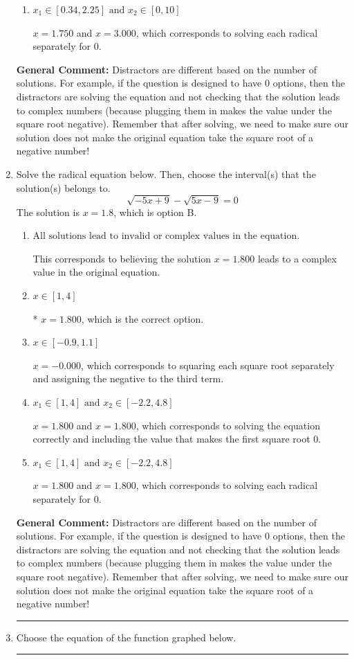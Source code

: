 \documentclass{extbook}[14pt]
\newcommand{\litem}[1]{\item #1

\rule{\textwidth}{0.4pt}}
\begin{document}
\begin{enumerate}
{\begin{enumerate}[label=\Alph*.]
* $x = 2.286$, which is the correct option.
\item \( x_1 \in [0.34, 2.25] \text{ and } x_2 \in [0,10] \)

$x = 1.750$ and $x = 3.000$, which corresponds to solving each radical separately for 0.
\end{enumerate}

\textbf{General Comment:} Distractors are different based on the number of solutions. For example, if the question is designed to have 0 options, then the distractors are solving the equation and not checking that the solution leads to complex numbers (because plugging them in makes the value under the square root negative). Remember that after solving, we need to make sure our solution does not make the original equation take the square root of a negative number!
}
\litem{
Solve the radical equation below. Then, choose the interval(s) that the solution(s) belongs to.
\[ \sqrt{-5 x + 9} - \sqrt{5 x - 9} = 0 \]The solution is \( x = 1.8 \), which is option B.\begin{enumerate}[label=\Alph*.]
\item \( \text{All solutions lead to invalid or complex values in the equation.} \)

This corresponds to believing the solution $x = 1.800$ leads to a complex value in the original equation.
\item \( x \in [1,4] \)

* $x = 1.800$, which is the correct option.
\item \( x \in [-0.9,1.1] \)

$x = -0.000$, which corresponds to squaring each square root separately and assigning the negative to the third term.
\item \( x_1 \in [1, 4] \text{ and } x_2 \in [-2.2,4.8] \)

$x = 1.800$ and $x = 1.800$, which corresponds to solving the equation correctly and including the value that makes the first square root 0.
\item \( x_1 \in [1, 4] \text{ and } x_2 \in [-2.2,4.8] \)

$x = 1.800$ and $x = 1.800$, which corresponds to solving each radical separately for 0.
\end{enumerate}

\textbf{General Comment:} Distractors are different based on the number of solutions. For example, if the question is designed to have 0 options, then the distractors are solving the equation and not checking that the solution leads to complex numbers (because plugging them in makes the value under the square root negative). Remember that after solving, we need to make sure our solution does not make the original equation take the square root of a negative number!
}
\litem{
Choose the equation of the function graphed below.

}
\end{enumerate}
\end{document}
